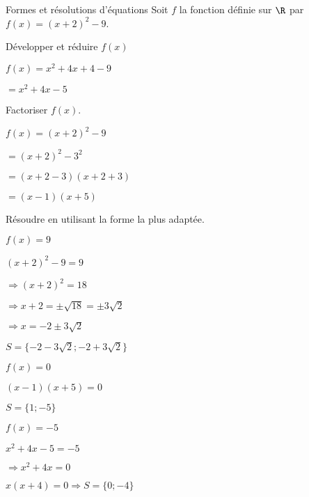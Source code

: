 \begin{EXO}{Formes et résolutions d'équations}{}
Soit $f$ la fonction définie sur $\R$ par $ f(x) = (x+2)^2-9$.
\begin{tcbenumerate}[2]
\tcbitem {} Développer et réduire $f(x)$

\begin{crep}
$f(x) = x^2+4x+4-9 $

$= x^2+4x-5$
\end{crep}

\tcbitem {} Factoriser $f(x)$.

\begin{crep}
$f(x) = (x+2)^2-9 $

$= (x+2)^2-3^2 $

$= (x+2-3)(x+2+3) $

$= (x-1)(x+5)$
\end{crep}
\end{tcbenumerate}
\begin{tcbenumerate}[1][3]
\tcbitem[colframe=black,boxrule=0.4pt] Résoudre en utilisant la forme la plus adaptée.
\vspace{-2mm}
\begin{tcbenumerate}[3][1][alph]
\tcbitem {} $f(x)=9$

\begin{crep}
$(x+2)^2-9 = 9 $

$\Rightarrow (x+2)^2 = 18$

$\Rightarrow x+2 = \pm \sqrt{18} = \pm 3\sqrt{2}$

$\Rightarrow x = -2 \pm 3\sqrt{2}$

$S = \{-2 - 3\sqrt{2} ; -2 + 3\sqrt{2}\}$
\end{crep}

\tcbitem {} $f(x)=0$

\begin{crep}
$(x-1)(x+5) = 0$

$S = \{1 ; -5\}$
\end{crep}

\tcbitem {} $f(x)=-5$

\begin{crep}
$x^2+4x-5 = -5$

$\Rightarrow x^2+4x = 0$

$x(x+4) = 0 \Rightarrow S = \{0 ; -4\}$
\end{crep}
\end{tcbenumerate}
\end{tcbenumerate}


\end{EXO}
